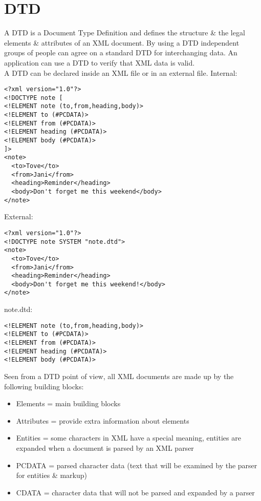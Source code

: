 \documentclass[11pt]{article}
\author{eo shiru}
\date{\today}
\title{}
\begin{document}
\tableofcontents

\section{DTD}
\label{sec:org2aec312}
A DTD is a Document Type Definition and defines the structure \& the legal elements \& attributes of an XML document. By using a DTD independent groups of people can agree on a standard DTD for interchanging data. An application can use a DTD to verify that XML data is valid.\\
A DTD can be declared inside an XML file or in an external file.
Internal:
\lstset{breaklines=true,language=XML,label= ,caption= ,captionpos=b,numbers=none}
\begin{lstlisting}
<?xml version="1.0"?>
<!DOCTYPE note [
<!ELEMENT note (to,from,heading,body)>
<!ELEMENT to (#PCDATA)>
<!ELEMENT from (#PCDATA)>
<!ELEMENT heading (#PCDATA)>
<!ELEMENT body (#PCDATA)>
]>
<note>
  <to>Tove</to>
  <from>Jani</from>
  <heading>Reminder</heading>
  <body>Don't forget me this weekend</body>
</note>
\end{lstlisting}
External:
\lstset{breaklines=true,language=XML,label= ,caption= ,captionpos=b,numbers=none}
\begin{lstlisting}
<?xml version="1.0"?>
<!DOCTYPE note SYSTEM "note.dtd">
<note>
  <to>Tove</to>
  <from>Jani</from>
  <heading>Reminder</heading>
  <body>Don't forget me this weekend!</body>
</note>
\end{lstlisting}
note.dtd:
\lstset{breaklines=true,language=XML,label= ,caption= ,captionpos=b,numbers=none}
\begin{lstlisting}
<!ELEMENT note (to,from,heading,body)>
<!ELEMENT to (#PCDATA)>
<!ELEMENT from (#PCDATA)>
<!ELEMENT heading (#PCDATA)>
<!ELEMENT body (#PCDATA)>
\end{lstlisting}
Seen from a DTD point of view, all XML documents are made up by the following building blocks:
\begin{itemize}
\item Elements =  main building blocks
\item Attributes = provide extra information about elements
\item Entities = some characters in XML have a special meaning, entities are expanded when a document is parsed by an XML parser
\item PCDATA = parsed character data (text that will be examined by the parser for entities \& markup)
\item CDATA = character data that will not be parsed and expanded by a parser
\end{itemize}
\end{document}
